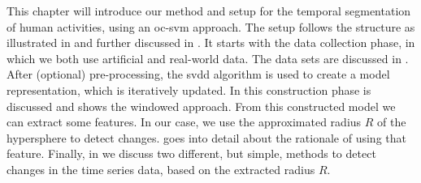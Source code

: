 This chapter will introduce our method and setup for the temporal segmentation of human activities, using an \gls{oc-svm} approach.
The setup follows the structure as illustrated in  and further discussed in .
It starts with the data collection phase, in which we both use artificial and real-world data.
The data sets are discussed in .
After (optional) pre-processing, the \gls{svdd} algorithm is used to create a model representation, which is iteratively updated.
In  this construction phase is discussed and shows the windowed approach.
From this constructed model we can extract some features.
In our case, we use the approximated radius $R$ of the hypersphere to detect changes.
 goes into detail about the rationale of using that feature.
Finally, in  we discuss two different, but simple, methods to detect changes in the time series data, based on the extracted radius $R$.






